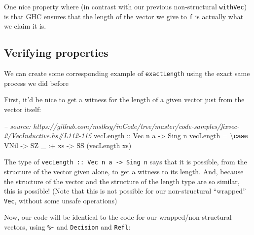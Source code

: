 \documentclass[]{article}
\newenvironment{Shaded}{}{}
\newcommand{\KeywordTok}[1]{\textcolor[rgb]{0.00,0.44,0.13}{\textbf{#1}}}
\newcommand{\DataTypeTok}[1]{\textcolor[rgb]{0.56,0.13,0.00}{#1}}
\newcommand{\CommentTok}[1]{\textcolor[rgb]{0.38,0.63,0.69}{\textit{#1}}}
\newcommand{\OtherTok}[1]{\textcolor[rgb]{0.00,0.44,0.13}{#1}}
\newcommand{\FunctionTok}[1]{\textcolor[rgb]{0.02,0.16,0.49}{#1}}
\newcommand{\NormalTok}[1]{#1}
\begin{document}
One nice property where (in contrast with our previous non-structural
\texttt{withVec}) is that GHC ensures that the length of the vector we give to
\texttt{f} is actually what we claim it is.

\subsection{Verifying properties}\label{verifying-properties-1}

We can create some corresponding example of \texttt{exactLength} using the exact
same process we did before

First, it'd be nice to get a witness for the length of a given vector just from
the vector itself:

\begin{Shaded}
\begin{Highlighting}[]
\CommentTok{-- source: https://github.com/mstksg/inCode/tree/master/code-samples/fixvec-2/VecInductive.hs#L112-115}
\OtherTok{vecLength ::} \DataTypeTok{Vec}\NormalTok{ n a }\OtherTok{->} \DataTypeTok{Sing}\NormalTok{ n}
\NormalTok{vecLength }\FunctionTok{=}\NormalTok{ \textbackslash{}}\KeywordTok{case}
    \DataTypeTok{VNil}    \OtherTok{->} \DataTypeTok{SZ}
\NormalTok{    _ }\FunctionTok{:+}\NormalTok{ xs }\OtherTok{->} \DataTypeTok{SS}\NormalTok{ (vecLength xs)}
\end{Highlighting}
\end{Shaded}

The type of \texttt{vecLength\ ::\ Vec\ n\ a\ -\textgreater{}\ Sing\ n} says
that it is possible, from the structure of the vector given alone, to get a
witness to its length. And, because the structure of the vector and the
structure of the length type are so similar, this is possible! (Note that this
is not possible for our non-structural ``wrapped'' \texttt{Vec}, without some
unsafe operations)

Now, our code will be identical to the code for our wrapped/non-structural
vectors, using \texttt{\%\textasciitilde{}} and \texttt{Decision} and
\texttt{Refl}:

\begin{Shaded}
\end{Shaded}
\end{document}
